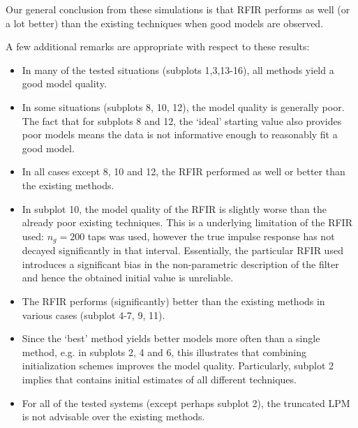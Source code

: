 Our general conclusion from these simulations is that RFIR performs as well (or a lot better) than the existing techniques when good models are observed.

{\footnotesize
A few additional remarks are appropriate with respect to these results:
\begin{itemize}
  \item In many of the tested situations (subplots 1,3,13-16), all methods yield a good model quality.
  \item In some situations (subplots 8, 10, 12), the model quality is generally poor. 
  The fact that for subplots 8 and 12, the `ideal' starting value  also provides poor models means the data is not informative enough to reasonably fit a good model.
  \item In all cases except 8, 10 and 12, the RFIR performed as well or better than the existing methods.
  \item In subplot 10, the model quality of the RFIR is slightly worse than the already poor existing techniques.
  This is a underlying limitation of the RFIR used: $n_g=200$ taps was used, however the true impulse response has not decayed significantly in that interval.
  Essentially, the particular RFIR used introduces a significant bias in the non-parametric description of the filter and hence the obtained initial value is unreliable.
  \item The RFIR performs (significantly) better than the existing methods in various cases (subplot 4-7, 9, 11).
  \item Since the `best' method  yields better models more often than a single method, e.g. in subplots 2, 4 and 6, this illustrates that combining initialization schemes improves the model quality.
  Particularly, subplot 2 implies that  contains initial estimates of all different techniques.
  \item For all of the tested systems (except perhaps subplot 2), the truncated LPM is not advisable over the existing methods.
\end{itemize}
}

